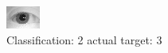 \begin{figure}[h!]
\begin{center}
\includegraphics[width=0.60\columnwidth]{figures/ID1194_class_2_target_3.png}
\end{center}
\caption{ Classification: 2 actual target: 3}
\label{fig:ID1194_class_2_target_3}
\end{figure}
